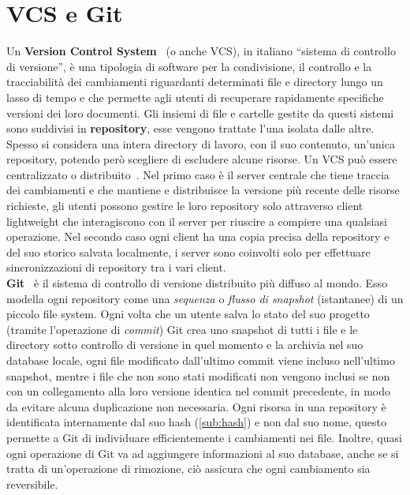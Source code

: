 \section{VCS e Git}
\label{sub:vcs}
Un \textbf{Version Control System}~\cite{vcs1} (o anche VCS), in italiano “sistema di controllo di versione”,
è una tipologia di software per la condivisione,
il controllo e la tracciabilità dei cambiamenti riguardanti determinati file e directory
lungo un lasso di tempo e che permette agli utenti di recuperare rapidamente specifiche
versioni dei loro documenti. Gli insiemi di file e cartelle gestite da questi sistemi
sono suddivisi in \textbf{repository}, esse vengono trattate l’una isolata dalle altre.
Spesso si considera una intera directory di lavoro, con il suo contenuto,
un’unica repository, potendo però scegliere di escludere alcune risorse.
Un VCS può essere centralizzato o distribuito~\cite{vcs2}.
Nel primo caso è il server centrale che tiene traccia dei cambiamenti e che mantiene e
distribuisce la versione più recente delle risorse richieste, gli utenti possono gestire
le loro repository solo attraverso client lightweight che interagiscono con il server
per riuscire a compiere una qualsiasi operazione.
Nel secondo caso ogni client ha una copia precisa della repository e del suo storico
salvata localmente, i server sono coinvolti solo per effettuare sincronizzazioni
di repository tra i vari client.
\\ 
\label{sub:git}
\textbf{Git}~\cite{git-21} è il sistema di controllo di versione distribuito più diffuso al mondo.
Esso modella ogni repository come una \emph{sequenza} o \emph{flusso di snapshot} (istantanee)
di un piccolo file system. Ogni volta che un utente salva lo stato del suo progetto
(tramite l’operazione di \emph{commit}) Git crea uno snapshot di tutti i file e le directory
sotto controllo di versione in quel momento e la archivia nel suo database locale, ogni
file modificato dall’ultimo commit viene incluso nell’ultimo snapshot, mentre i file che
non sono stati modificati non vengono inclusi se non con un collegamento alla loro versione identica
nel commit precedente, in modo da evitare alcuna duplicazione non necessaria.
Ogni risorsa in una repository è identificata internamente dal suo hash (\autoref{sub:hash}) e non dal suo nome,
questo permette a Git di individuare efficientemente i cambiamenti nei file.
Inoltre, quasi ogni operazione di Git va ad aggiungere informazioni al suo database, anche se si tratta
di un’operazione di rimozione, ciò assicura che ogni cambiamento sia reversibile.

